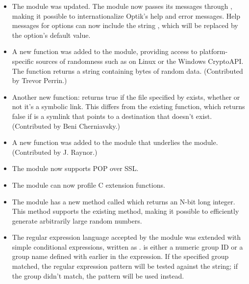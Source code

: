 \documentclass{howto}
\begin{document}
\begin{itemize}
\item The  module was updated.  The module now passes
its messages through , making it possible
to internationalize Optik's help and error messages.  Help messages
for options can now include the string , which will
be replaced by the option's default value.

\item A new  function 
was added to the  module, providing access to
platform-specific sources of randomness such as
 on Linux or the Windows CryptoAPI.  The
function returns a string containing  bytes of random data.
(Contributed by Trevor Perrin.)

\item Another new function:  
returns true if the file specified by  exists, whether or
not it's a symbolic link.  This differs from the existing
 function, which returns false if 
 is a symlink that points to a destination that doesn't exist.
(Contributed by Beni Cherniavsky.)

\item A new  function was added to the
 module that underlies the  module.
(Contributed by J. Raynor.)

\item The  module now supports POP over SSL.

\item The  module can now profile C extension functions.

\item The  module has a new method called  
   which returns an N-bit long integer.  This method supports the existing
    method, making it possible to efficiently generate
   arbitrarily large random numbers.

\item The regular expression language accepted by the  module
   was extended with simple conditional expressions, written as
   .   is either a
   numeric group ID or a group name defined with  
   earlier in the expression.  If the specified group matched, the
   regular expression pattern  will be tested against the string; if
   the group didn't match, the pattern  will be used instead.


\end{itemize}
\end{document}
